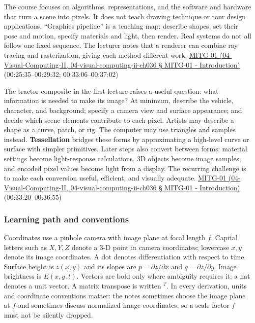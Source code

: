The course focuses on algorithms, representations, and the software and hardware that turn a scene into pixels. It does not teach drawing technique or tour design applications. ``Graphics pipeline'' is a teaching map: describe shapes, set their pose and motion, specify materials and light, then render. Real systems do not all follow one fixed sequence. The lecturer notes that a renderer can combine ray tracing and rasterization, giving each method different work. \href{}{MITG-01 (04-Visual-Computing-II, 04-visual-computing-ii-ch036 § MITG-01 - Introduction)} (00:25:35--00:29:32; 00:33:06--00:37:02)

The tractor composite in the first lecture raises a useful question: what information is needed to make its image? At minimum, describe the vehicle, character, and background; specify a camera view and surface appearance; and decide which scene elements contribute to each pixel. Artists may describe a shape as a curve, patch, or rig. The computer may use triangles and samples instead. \textbf{Tessellation} bridges these forms by approximating a high-level curve or surface with simpler primitives. Later steps also convert between forms: material settings become light-response calculations, 3D objects become image samples, and encoded pixel values become light from a display. The recurring challenge is to make each conversion useful, efficient, and visually adequate. \href{}{MITG-01 (04-Visual-Computing-II, 04-visual-computing-ii-ch036 § MITG-01 - Introduction)} (00:33:20--00:36:55)

\subsubsection{Learning path and conventions}\label{learning-path-and-conventions}

Coordinates use a pinhole camera with image plane at focal length \(f\). Capital letters such as \(X,Y,Z\) denote a 3-D point in camera coordinates; lowercase \(x,y\) denote its image coordinates. A dot denotes differentiation with respect to time. Surface height is \(z(x,y)\) and its slopes are \(p=\partial z/\partial x\) and \(q=\partial z/\partial y\). Image brightness is \(E(x,y,t)\). Vectors are bold only where ambiguity requires it; a hat denotes a unit vector. A matrix transpose is written \(^T\). In every derivation, units and coordinate conventions matter: the notes sometimes choose the image plane at \(f\) and sometimes discuss normalized image coordinates, so a scale factor \(f\) must not be silently dropped.


